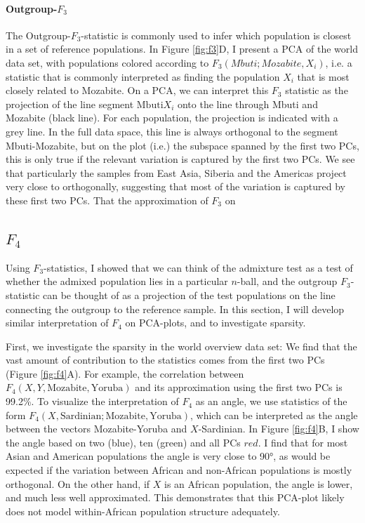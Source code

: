 \documentclass[12pt,a4pape, fullpage]{article}
\begin{document}
\paragraph{Outgroup-$F_3$}
The Outgroup-$F_3$-statistic is commonly used to infer which population is closest in a set of reference populations. In Figure \ref{fig:f3}D, I present a PCA of the world data set, with populations colored according to $F_3(Mbuti; Mozabite, X_i)$, i.e. a statistic that is commonly interpreted as finding the population $X_i$ that is most closely related to Mozabite. On a PCA, we can interpret this $F_3$ statistic as the projection of the line segment $\text{Mbuti}X_i$ onto the line through Mbuti and Mozabite (black line). For each population, the projection is indicated with a grey line. In the full data space, this line is always orthogonal to the segment Mbuti-Mozabite, but on the plot (i.e.) the subspace spanned by the first two PCs, this is only true if the relevant variation is captured by the first two PCs. We see that particularly the samples from East Asia, Siberia and the Americas project very close to orthogonally, suggesting that most of the variation is captured by these first two PCs. That the approximation of $F_3$ on 


\subsection{$F_4$}
Using $F_3$-statistics, I showed that we can think of the admixture test as a test of whether the admixed population lies in a particular $n$-ball, and the outgroup $F_3$-statistic can be thought of as a projection of the test populations on the line connecting the outgroup to the reference sample. In this section, I will develop similar interpretation of $F_4$ on PCA-plots, and to investigate sparsity. 

First, we investigate the sparsity in the world overview data set: We find that the vast amount of contribution to the statistics comes from the first two PCs (Figure \ref{fig:f4}A). For example, the correlation between $F_4(X, Y, \text{Mozabite}, \text{Yoruba})$ and its approximation using the first two PCs is 99.2\%. To visualize the interpretation of $F_4$ as an angle, we use statistics of the form $F_4(X, \text{Sardinian}; \text{Mozabite}, \text{Yoruba})$, which can be interpreted as the angle between the vectors Mozabite-Yoruba and $X$-Sardinian. In Figure \ref{fig:f4}B, I show the angle based on two (blue), ten (green) and all PCs $red$. I find that for most Asian and American populations the angle is very close to 90°, as would be expected if the variation between African and non-African populations is mostly orthogonal. On the other hand, if $X$ is an African population, the angle is lower, and much less well approximated. This demonstrates that this PCA-plot likely does not model within-African population structure adequately. 
\end{document}
